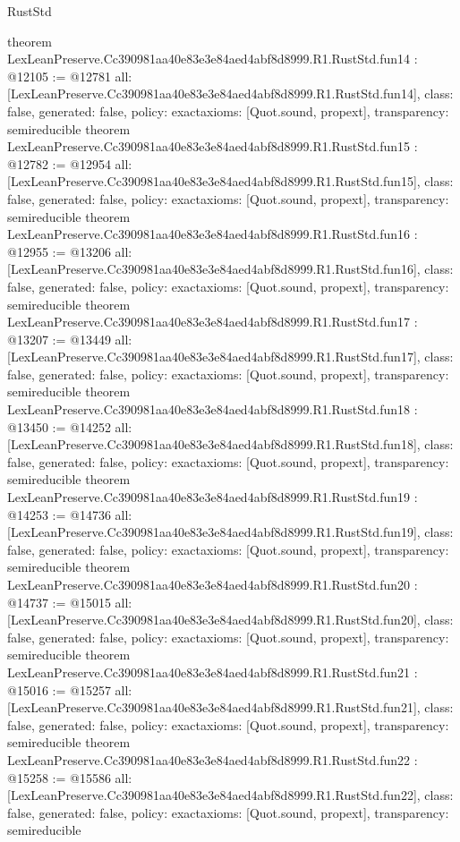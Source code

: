 \begin{lexlean}{RustStd}
\begin{coremodule}
{}
theorem LexLeanPreserve.Cc390981aa40e83e3e84aed4abf8d8999.R1.RustStd.fun14 : @12105 := @12781 {
  all: [LexLeanPreserve.Cc390981aa40e83e3e84aed4abf8d8999.R1.RustStd.fun14],
  class: false,
  generated: false,
  policy: exact{axioms: [Quot.sound, propext]},
  transparency: semireducible
}
theorem LexLeanPreserve.Cc390981aa40e83e3e84aed4abf8d8999.R1.RustStd.fun15 : @12782 := @12954 {
  all: [LexLeanPreserve.Cc390981aa40e83e3e84aed4abf8d8999.R1.RustStd.fun15],
  class: false,
  generated: false,
  policy: exact{axioms: [Quot.sound, propext]},
  transparency: semireducible
}
theorem LexLeanPreserve.Cc390981aa40e83e3e84aed4abf8d8999.R1.RustStd.fun16 : @12955 := @13206 {
  all: [LexLeanPreserve.Cc390981aa40e83e3e84aed4abf8d8999.R1.RustStd.fun16],
  class: false,
  generated: false,
  policy: exact{axioms: [Quot.sound, propext]},
  transparency: semireducible
}
theorem LexLeanPreserve.Cc390981aa40e83e3e84aed4abf8d8999.R1.RustStd.fun17 : @13207 := @13449 {
  all: [LexLeanPreserve.Cc390981aa40e83e3e84aed4abf8d8999.R1.RustStd.fun17],
  class: false,
  generated: false,
  policy: exact{axioms: [Quot.sound, propext]},
  transparency: semireducible
}
theorem LexLeanPreserve.Cc390981aa40e83e3e84aed4abf8d8999.R1.RustStd.fun18 : @13450 := @14252 {
  all: [LexLeanPreserve.Cc390981aa40e83e3e84aed4abf8d8999.R1.RustStd.fun18],
  class: false,
  generated: false,
  policy: exact{axioms: [Quot.sound, propext]},
  transparency: semireducible
}
theorem LexLeanPreserve.Cc390981aa40e83e3e84aed4abf8d8999.R1.RustStd.fun19 : @14253 := @14736 {
  all: [LexLeanPreserve.Cc390981aa40e83e3e84aed4abf8d8999.R1.RustStd.fun19],
  class: false,
  generated: false,
  policy: exact{axioms: [Quot.sound, propext]},
  transparency: semireducible
}
theorem LexLeanPreserve.Cc390981aa40e83e3e84aed4abf8d8999.R1.RustStd.fun20 : @14737 := @15015 {
  all: [LexLeanPreserve.Cc390981aa40e83e3e84aed4abf8d8999.R1.RustStd.fun20],
  class: false,
  generated: false,
  policy: exact{axioms: [Quot.sound, propext]},
  transparency: semireducible
}
theorem LexLeanPreserve.Cc390981aa40e83e3e84aed4abf8d8999.R1.RustStd.fun21 : @15016 := @15257 {
  all: [LexLeanPreserve.Cc390981aa40e83e3e84aed4abf8d8999.R1.RustStd.fun21],
  class: false,
  generated: false,
  policy: exact{axioms: [Quot.sound, propext]},
  transparency: semireducible
}
theorem LexLeanPreserve.Cc390981aa40e83e3e84aed4abf8d8999.R1.RustStd.fun22 : @15258 := @15586 {
  all: [LexLeanPreserve.Cc390981aa40e83e3e84aed4abf8d8999.R1.RustStd.fun22],
  class: false,
  generated: false,
  policy: exact{axioms: [Quot.sound, propext]},
  transparency: semireducible
}
\end{coremodule}
\end{lexlean}
